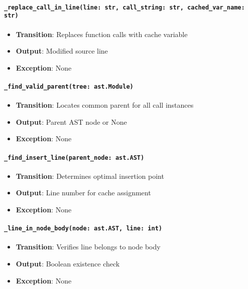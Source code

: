 \documentclass[12pt, titlepage]{article}
\begin{document}
\paragraph{\texttt{\_replace\_call\_in\_line(line: str, call\_string: str, cached\_var\_name: str)}}
\begin{itemize}
\item \textbf{Transition}: Replaces function calls with cache variable
\item \textbf{Output}: Modified source line
\item \textbf{Exception}: None
\end{itemize}

\paragraph{\texttt{\_find\_valid\_parent(tree: ast.Module)}}
\begin{itemize}
\item \textbf{Transition}: Locates common parent for all call instances
\item \textbf{Output}: Parent AST node or None
\item \textbf{Exception}: None
\end{itemize}

\paragraph{\texttt{\_find\_insert\_line(parent\_node: ast.AST)}}
\begin{itemize}
\item \textbf{Transition}: Determines optimal insertion point
\item \textbf{Output}: Line number for cache assignment
\item \textbf{Exception}: None
\end{itemize}

\paragraph{\texttt{\_line\_in\_node\_body(node: ast.AST, line: int)}}
\begin{itemize}
\item \textbf{Transition}: Verifies line belongs to node body
\item \textbf{Output}: Boolean existence check
\item \textbf{Exception}: None
\end{itemize}
\end{document}
